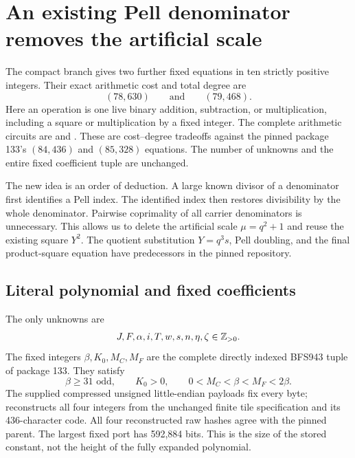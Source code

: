 \section{An existing Pell denominator removes the artificial scale}
\label{sec:compact-unscaled}

The compact branch gives two further fixed equations in ten strictly
positive integers. Their exact arithmetic cost and total degree are
\[
 (78,630)\qquad\text{and}\qquad(79,468).
\]
Here an operation is one live binary addition, subtraction, or
multiplication, including a square or multiplication by a fixed integer.
The complete arithmetic circuits are  and
. These are cost--degree tradeoffs against
the pinned package 133's $(84,436)$ and $(85,328)$ equations. The number
of unknowns and the entire fixed coefficient tuple are unchanged.

The new idea is an order of deduction. A large known divisor of a
denominator first identifies a Pell index. The identified index then
restores divisibility by the whole denominator. Pairwise coprimality of
all carrier denominators is unnecessary. This allows us to delete the
artificial scale $\mu=q^2+1$ and reuse the existing square $Y^2$.
The quotient substitution $Y=q^3s$, Pell doubling, and the final
product-square equation have predecessors in the pinned repository.

\subsection{Literal polynomial and fixed coefficients}

The only unknowns are
\[
 J,F,\alpha,i,T,w,s,n,\eta,\zeta\in\mathbb Z_{>0}.
\]
The fixed integers $\beta,K_0,M_C,M_F$ are the complete directly indexed
BFS943 tuple of package 133. They satisfy
\[
 \beta\ge31\text{ odd},\qquad K_0>0,\qquad
 0<M_C<\beta<M_F<2\beta.
\]
The supplied compressed unsigned little-endian payloads fix every byte;
 reconstructs all four integers
from the unchanged finite tile specification and its 436-character code.
All four reconstructed raw hashes agree with the pinned parent.
The largest fixed port has 592,884 bits. This is the size of the stored
constant, not the height of the fully expanded polynomial.

